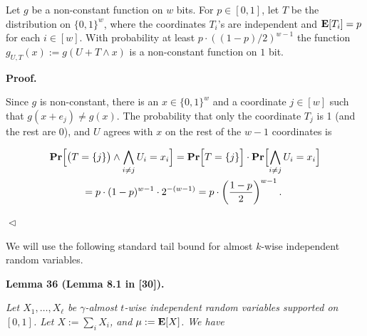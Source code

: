 Let $g$ be a non-constant function on $w$ bits.
For $p\in[0,1]$, let $T$ be the distribution on $\{0,1\}^{w}$, where the coordinates $T_{i}$’s are independent and $\mathop{\bf E\/}[T_{i}]=p$ for each $i\in[w]$.
With probability at least $p\cdot((1-p)/2)^{w-1}$ the function $g_{U,T}(x):=g(U+T\wedge x)$ is a non-constant function on $1$ bit.\par







\par\medskip\noindent\textbf{
\textbf{Proof}.}\par




Since $g$ is non-constant, there is an $x\in\{0,1\}^{w}$ and a coordinate $j\in[w]$ such that $g(x+e_{j})\neq g(x)$.
The probability that only the coordinate $T_{j}$ is 1 (and the rest are 0), and $U$ agrees with $x$ on the rest of the $w-1$ coordinates is\par


\[\begin{gathered}
\displaystyle\mathop{\bf Pr\/}\Bigl{[}\bigl{(}T=\{j\}\bigr{)}\wedge\bigwedge_{i\neq j}U_{i}=x_{i}\Bigr{]} \displaystyle=\mathop{\bf Pr\/}\Bigl{[}T=\{j\}\Bigr{]}\cdot\mathop{\bf Pr\/}\Bigl{[}\bigwedge_{i\neq j}U_{i}=x_{i}\Bigr{]} \\
\displaystyle=p\cdot(1-p)^{w-1}\cdot 2^{-(w-1)}=p\cdot\left(\frac{1-p}{2}\right)^{w-1}.\
\end{gathered}\]


$\vartriangleleft$\par




We will use the following standard tail bound for almost $k$-wise independent random variables.\par





\par\medskip\noindent\textbf{
\textbf{Lemma 36}\textbf{ }(Lemma 8.1 in [30])\textbf{.}
}\par



\emph{Let $X_{1},\ldots,X_{\ell}$ be $\gamma$-almost $t$-wise independent random variables supported on $[0,1]$.
Let $X:=\sum_{i}X_{i}$, and $\mu:=\mathop{\bf E\/}[X]$.
We have}\par



